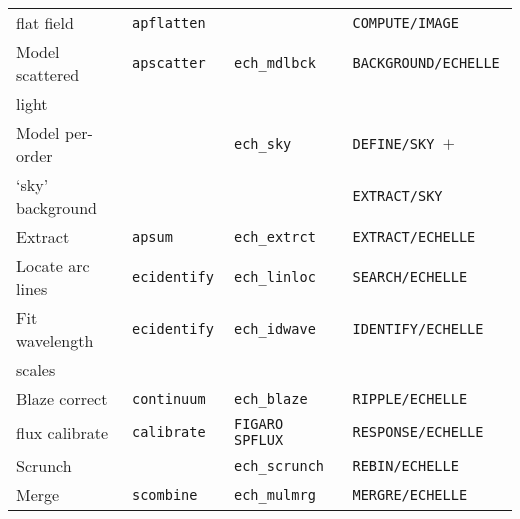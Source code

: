 \begin{latex}
\begin{table}
\begin{center}
\begin{tabular}{llll}
flat field         & {\tt apflatten       } &                      & {\tt COMPUTE/IMAGE      } \\
Model scattered    & {\tt apscatter       } & {\tt ech\_mdlbck   } & {\tt BACKGROUND/ECHELLE } \\
light              &                        &                      &                           \\
Model per-order    &                        & {\tt ech\_sky      } & {\tt DEFINE/SKY $+$     } \\
`sky' background   &                        &                      & {\tt EXTRACT/SKY        } \\
Extract            & {\tt apsum           } & {\tt ech\_extrct   } & {\tt EXTRACT/ECHELLE    } \\
Locate arc lines   & {\tt ecidentify      } & {\tt ech\_linloc   } & {\tt SEARCH/ECHELLE     } \\
Fit wavelength     & {\tt ecidentify      } & {\tt ech\_idwave   } & {\tt IDENTIFY/ECHELLE   } \\
scales             &                        &                      &                           \\
Blaze correct      & {\tt continuum       } & {\tt ech\_blaze    } & {\tt RIPPLE/ECHELLE     } \\
flux calibrate     & {\tt calibrate       } & {\tt FIGARO SPFLUX } & {\tt RESPONSE/ECHELLE   } \\
Scrunch            &                        & {\tt ech\_scrunch  } & {\tt REBIN/ECHELLE      } \\
Merge              & {\tt scombine        } & {\tt ech\_mulmrg   } & {\tt MERGRE/ECHELLE     } \\
\hline\hline
\end{tabular}
\end{center}
\end{table}
\end{latex}

